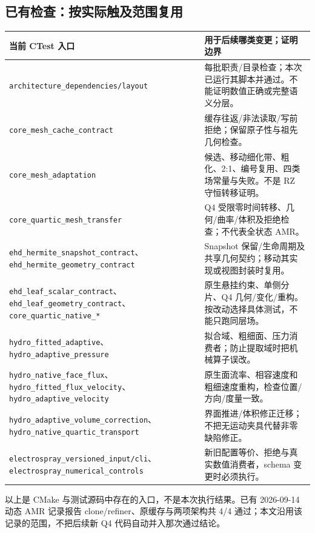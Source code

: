 \documentclass[UTF8,a4paper,11pt,fontset=fandol]{ctexart}
\newcommand{\code}[1]{\nolinkurl{#1}}
\begin{document}
\subsection{已有检查：按实际触及范围复用}
\begin{longtable}{@{}P{.43\textwidth}P{.51\textwidth}@{}}
\toprule 当前 CTest 入口 & 用于后续哪类变更；证明边界\\\midrule\endhead
\code{architecture_dependencies/layout} & 每批职责/目录检查；本次已运行其脚本并通过。不能证明数值正确或完整语义分层。\\
\code{core_mesh_cache_contract} & 缓存往返/非法读取/写前拒绝；保留原子性与祖先几何检查。\\
\code{core_mesh_adaptation} & 候选、移动细化带、粗化、2:1、编号复用、四类场常量与失败。不是 RZ 守恒转移证明。\\
\code{core_quartic_mesh_transfer} & Q4 受限零时间转移、几何/曲率/体积及拒绝检查；不代表全状态 AMR。\\
\code{ehd_hermite_snapshot_contract}、\code{ehd_hermite_geometry_contract} & Snapshot 保留/生命周期及共享几何契约；移动其实现或视图封装时复用。\\
\code{ehd_leaf_scalar_contract}、\code{ehd_leaf_geometry_contract}、\code{core_quartic_native_*} & 原生悬挂约束、单侧分片、Q4 几何/变化/重构。按改动选择具体测试，不能只跑同层场。\\
\code{hydro_fitted_adaptive}、\code{hydro_adaptive_pressure} & 拟合域、粗细面、压力消费者；防止提取域时把机械算子误改。\\
\code{hydro_native_face_flux}、\code{hydro_fitted_flux_velocity}、\code{hydro_adaptive_velocity} & 原生面流率、相容速度和粗细速度重构，检查位置/方向/度量一致。\\
\code{hydro_adaptive_volume_correction}、\code{hydro_native_quartic_transport} & 界面推进/体积修正迁移；不把无运动夹具代替非零缺陷修正。\\
\code{electrospray_versioned_input/cli}、\code{electrospray_numerical_controls} & 新旧配置等价、拒绝与真实数值消费者，schema 变更时必须执行。\\
\bottomrule
\end{longtable}
以上是 CMake 与测试源码中存在的入口，不是本次执行结果。已有 2026-09-14 动态 AMR 记录报告 clone/refiner、原缓存与两项架构共 4/4 通过；本文沿用该记录的范围，不把后续新 Q4 代码自动并入那次通过结论。
\end{document}
